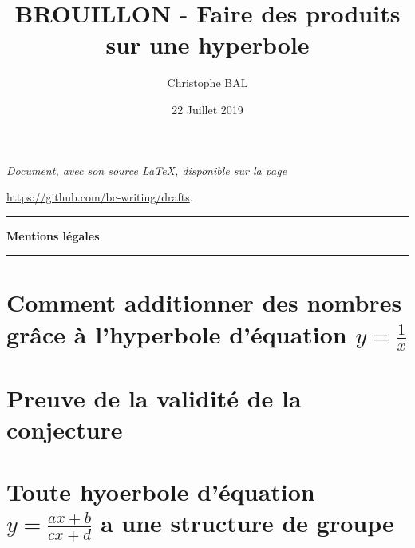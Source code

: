 \documentclass[12pt]{amsart}
\begin{document}
\title{BROUILLON - Faire des produits sur une hyperbole}
\author{Christophe BAL}
\date{22 Juillet 2019}
\maketitle


\begin{center}
	\itshape
	Document, avec son source \LaTeX, disponible sur la page
	
	\url{https://github.com/bc-writing/drafts}.
\end{center}


\bigskip


\begin{center}
	\hrule\vspace{.3em}
	{
		\fontsize{1.35em}{1em}\selectfont
		\textbf{Mentions \og légales \fg}
	}
			
	\vspace{0.45em}
	\doclicenseThis
	\hrule
\end{center}



\setcounter{tocdepth}{2}
\tableofcontents




\newpage

\section{\texorpdfstring{Comment additionner des nombres grâce à l'hyperbole d'équation $y = \frac{1}{x}$}%
                        {Comment additionner des nombres grâce à l'hyperbole d'équation y = 1/x}}





\section{Preuve de la validité de la conjecture} \label{proof}





\section{\texorpdfstring{Toute hyoerbole d'équation $y = \frac{a x + b}{c x + d}$ a une structure de groupe}%
                        {Toute hyoerbole d'équation y = (a x + b) / (c x + d) a une structure de groupe}}
      




\end{document}
